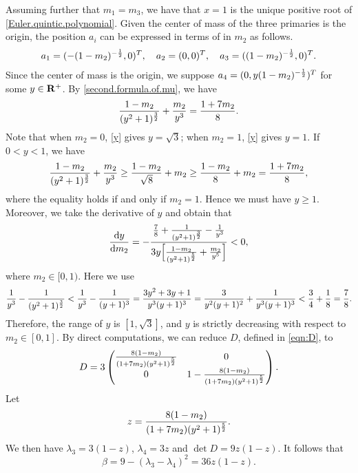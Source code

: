 \documentclass[11pt]{article}
\def\d{{\mathrm{d}}}
\def\R{{\bf R}}
\begin{document}
Assuming further that $m_1 = m_3$, we have that $x=1$ is the unique positive root of \eqref{Euler.quintic.polynomial}.
Given the center of mass of the three primaries is the origin, the position $a_i$ can be expressed in terms of in $m_2$ as follows.
\begin{align}
a_1 = (-(1-m_2)^{-{1\over2}},0)^T,\quad 
a_2 = (0,0)^T,\quad 
a_3 = ((1-m_2)^{-{1\over2}},0)^T.
\end{align}
Since the center of mass is the origin,
we suppose $a_4=(0,y(1-m_2)^{-{1\over2}})^T$ for some $y\in\R^+$.
By \eqref{second.formula.of.mu}, we have
\begin{equation}\label{y}
{1-m_2\over(y^2+1)^{3\over2}} + {m_2\over y^3}={1+7m_2\over8}.
\end{equation}
Note that when $m_2=0$, \eqref{y} gives $y=\sqrt{3}$;
when $m_2=1$, \eqref{y} gives $y=1$.
If $0<y<1$, we have
\begin{equation}
{1-m_2\over(y^2+1)^{3\over2}} + {m_2\over y^3}\ge{1-m_2\over\sqrt{8}}+m_2\ge{1-m_2\over8}+m_2={1+7m_2\over8},
\end{equation}
where the equality holds if and only if $m_2=1$.
Hence we must have $y\ge1$.
Moreover, we take the derivative of $y$ and obtain that 
\begin{equation}\label{y.prime}
{\d y\over \d m_2}
=-\frac{{7\over8}+{1\over(y^2+1)^{3\over2}}-{1\over y^3}}
       {3y\Big[{1-m_2\over(y^2+1)^{5\over2}} + {m_2\over y^5}\Big]}
       <0,
\end{equation}
where $m_2\in[0,1)$.
Here we use
$$
{1\over y^3}-{1\over(y^2+1)^{3\over2}}<{1\over y^3}-{1\over (y+1)^3}
={3y^2+3y+1\over y^3(y+1)^3}={3\over y^2(y+1)^2}+{1\over y^3(y+1)^3}
<{3\over4}+{1\over8}={7\over8}.
$$
Therefore, the range of $y$ is $[1,\sqrt{3}]$,
and $y$ is strictly decreasing with respect to $m_2\in[0,1]$.
By direct computations,  we can reduce $D$, defined in \eqref{eqn:D}, to 
\begin{equation}
D=3\left(\begin{matrix}
{8(1-m_2)\over(1+7m_2)(y^2+1)^{5\over2}} & 0\\
0 & 1 - {8(1-m_2)\over(1+7m_2)(y^2+1)^{5\over2}}
\end{matrix}\right).
\end{equation}
Let
\begin{equation}\label{z}
z = {8(1-m_2)\over(1+7m_2)(y^2+1)^{5\over2}}.
\end{equation}
We then have $\lambda_3=3(1-z)$, $\lambda_4=3z$ and $\det D=9z(1-z)$. It follows that 
\begin{equation}\label{beta}
\beta = 9-(\lambda_3-\lambda_4)^2=36z(1-z).
\end{equation}
\end{document}
